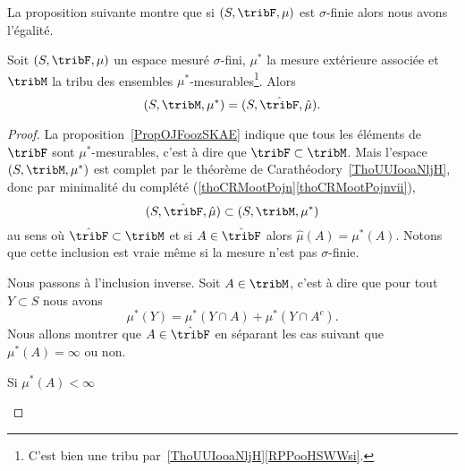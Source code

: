 La proposition suivante montre que si \( (S,\tribF,\mu)\) est \( \sigma\)-finie alors nous avons l'égalité.
\begin{proposition} \label{PropIIHooAIbfj}
    Soit \( (S,\tribF,\mu)\) un espace mesuré \( \sigma\)-fini, \( \mu^*\) la mesure extérieure associée et \( \tribM\) la tribu des ensembles \( \mu^*\)-mesurables\footnote{C'est bien une tribu par~\ref{ThoUUIooaNljH}\ref{RPPooHSWWsi}.}. Alors
    \begin{equation}
    (S,\tribM,\mu^*) = (S,\hat\tribF,\hat\mu).
    \end{equation}
\end{proposition}

\begin{proof}
    La proposition~\ref{PropOJFoozSKAE} indique que tous les éléments de \( \tribF\) sont \( \mu^*\)-mesurables, c'est à dire que \( \tribF\subset \tribM\). Mais l'espace \( (S,\tribM,\mu^*)\) est complet par le théorème de Carathéodory~\ref{ThoUUIooaNljH}, donc par minimalité du complété (\ref{thoCRMootPojn}\ref{thoCRMootPojnvii}),
    \begin{equation}
        (S,\hat\tribF,\hat\mu)\subset(S,\tribM,\mu^*)
    \end{equation}
    au sens où \( \hat\tribF\subset\tribM\) et si \( A\in\hat\tribF\) alors \( \hat\mu(A)=\mu^*(A)\). Notons que cette inclusion est vraie même si la mesure n'est pas \( \sigma\)-finie.

    Nous passons à l'inclusion inverse. Soit \( A\in\tribM\), c'est à dire que pour tout \( Y\subset S\) nous avons
    \begin{equation}    \label{EqTZAooTCdGg}
        \mu^*(Y)=\mu^*(Y\cap A)+\mu^*(Y\cap A^c).
    \end{equation}
    Nous allons montrer que \( A\in\hat\tribF\) en séparant les cas suivant que \( \mu^*(A)=\infty\) ou non.

    \begin{subproof}
        \item[Si \( \mu^*(A)<\infty\)]


\end{subproof}
\end{proof}
